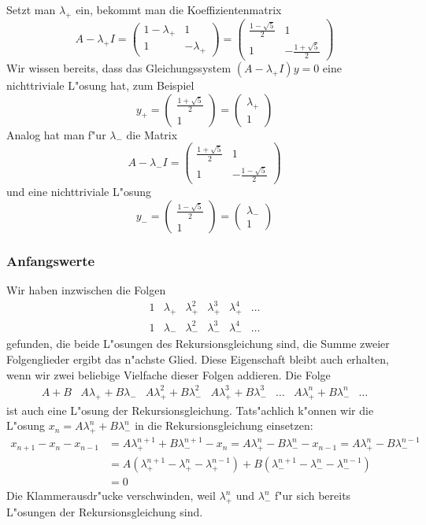 Setzt man $\lambda_+$ ein, bekommt man die Koeffizientenmatrix
$$
A-\lambda_+I=
\begin{pmatrix}
1-\lambda_+&1\\1&-\lambda_+
\end{pmatrix}
=
\begin{pmatrix}
\frac{1-\sqrt{5}}2&1\\1&-\frac{1+\sqrt{5}}2
\end{pmatrix}
$$
Wir wissen bereits, dass das Gleichungssystem $(A-\lambda_+I)y=0$
eine nichttriviale L"osung hat, zum Beispiel
$$y_+=\begin{pmatrix}
\frac{1+\sqrt{5}}2\\1
\end{pmatrix}
=\begin{pmatrix}
\lambda_+\\1
\end{pmatrix}
$$
Analog hat man f"ur $\lambda_-$ die Matrix
$$
A-\lambda_-I=
\begin{pmatrix}
\frac{1+\sqrt{5}}2&1\\
1&-\frac{1-\sqrt{5}}2
\end{pmatrix}
$$
und eine nichttriviale L"osung 
$$y_-=\begin{pmatrix}
\frac{1-\sqrt{5}}2\\
1
\end{pmatrix}=
\begin{pmatrix}
\lambda_-\\1
\end{pmatrix}
$$
\subsubsection{Anfangswerte}
Wir haben inzwischen die Folgen
$$
\begin{matrix}
1&\lambda_+&\lambda_+^2&\lambda_+^3&\lambda_+^4&\dots\\
1&\lambda_-&\lambda_-^2&\lambda_-^3&\lambda_-^4&\dots
\end{matrix}
$$
gefunden, die beide L"osungen des Rekursionsgleichung sind, die Summe
zweier Folgenglieder ergibt das n"achste Glied.
Diese Eigenschaft bleibt auch erhalten, wenn wir zwei beliebige
Vielfache dieser Folgen addieren. Die Folge
$$
\begin{matrix}
A+B
&A\lambda_++B\lambda_-
&A\lambda_+^2+B\lambda_-^2
&A\lambda_+^3+B\lambda_-^3
&\dots
&A\lambda_+^n+B\lambda_-^n
&\dots
\end{matrix}
$$
ist auch eine L"osung der Rekursionsgleichung. Tats"achlich k"onnen
wir die L"osung
$x_n=A\lambda_+^n + B\lambda_-^n$
in die Rekursionsgleichung einsetzen:
\begin{align*}
x_{n+1}-x_n-x_{n-1}
&=A\lambda_+^{n+1} + B\lambda_-^{n+1}
-x_n=A\lambda_+^n - B\lambda_-^n
-x_{n-1}=A\lambda_+^n - B\lambda_-^{n-1}
\\
&=
A(\lambda_+^{n+1}-\lambda_+^n-\lambda_+^{n-1})
+
B(\lambda_-^{n+1}-\lambda_-^n-\lambda_-^{n-1})
\\
&=0
\end{align*}
Die Klammerausdr"ucke verschwinden, weil $\lambda_+^n$ und $\lambda_-^n$
f"ur sich bereits L"osungen der Rekursionsgleichung sind.

